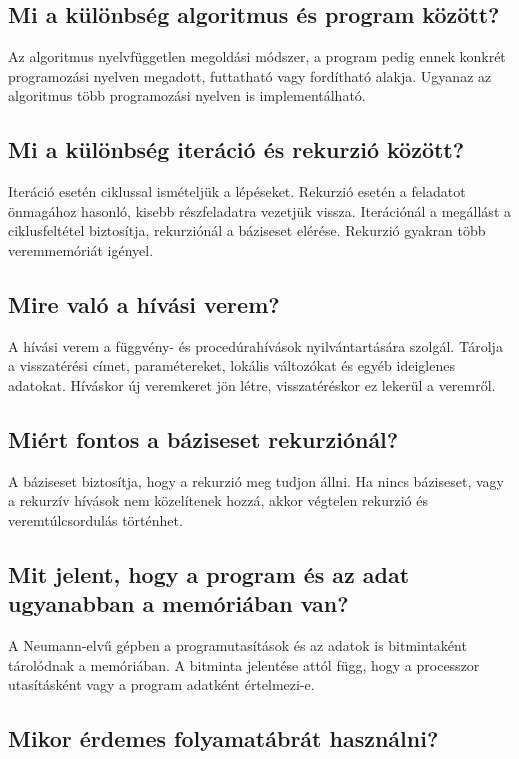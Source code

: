 \subsection{Mi a különbség algoritmus és program között?}

Az algoritmus nyelvfüggetlen megoldási módszer, a program pedig ennek konkrét programozási nyelven megadott, futtatható vagy fordítható alakja. Ugyanaz az algoritmus több programozási nyelven is implementálható.

\subsection{Mi a különbség iteráció és rekurzió között?}

Iteráció esetén ciklussal ismételjük a lépéseket. Rekurzió esetén a feladatot önmagához hasonló, kisebb részfeladatra vezetjük vissza. Iterációnál a megállást a ciklusfeltétel biztosítja, rekurziónál a báziseset elérése. Rekurzió gyakran több veremmemóriát igényel.

\subsection{Mire való a hívási verem?}

A hívási verem a függvény- és procedúrahívások nyilvántartására szolgál. Tárolja a visszatérési címet, paramétereket, lokális változókat és egyéb ideiglenes adatokat. Híváskor új veremkeret jön létre, visszatéréskor ez lekerül a veremről.

\subsection{Miért fontos a báziseset rekurziónál?}

A báziseset biztosítja, hogy a rekurzió meg tudjon állni. Ha nincs báziseset, vagy a rekurzív hívások nem közelítenek hozzá, akkor végtelen rekurzió és veremtúlcsordulás történhet.

\subsection{Mit jelent, hogy a program és az adat ugyanabban a memóriában van?}

A Neumann-elvű gépben a programutasítások és az adatok is bitmintaként tárolódnak a memóriában. A bitminta jelentése attól függ, hogy a processzor utasításként vagy a program adatként értelmezi-e.

\subsection{Mikor érdemes folyamatábrát használni?}

